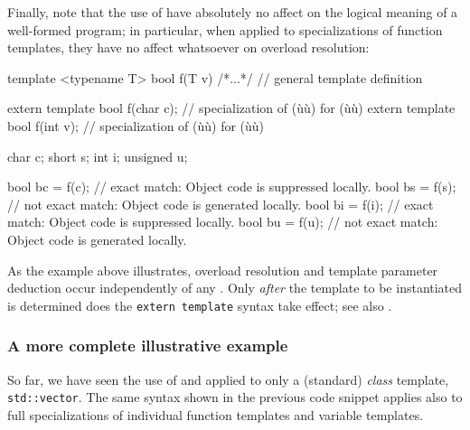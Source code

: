 Finally, note that the use of  have absolutely no affect on the logical meaning of a
well-formed program; in particular, when applied to specializations of
function templates, they have no affect whatsoever on overload
resolution:

\begin{emcppslisting}
template <typename T> bool f(T v) {/*...*/}  // general template definition

extern template bool f(char c);  // specialization of (ù{}ù) for (ù{}ù)
extern template bool f(int v);   // specialization of (ù{}ù) for (ù{}ù)

char     c;
short    s;
int      i;
unsigned u;

bool bc = f(c);  // exact match: Object code is suppressed locally.
bool bs = f(s);  // not exact match: Object code is generated locally.
bool bi = f(i);  // exact match: Object code is suppressed locally.
bool bu = f(u);  // not exact match: Object code is generated locally.
\end{emcppslisting}

\noindent As the example above illustrates, overload resolution and template
parameter deduction occur independently of any
. Only \emph{after}
the template to be instantiated is determined does the
\lstinline!extern!~\lstinline!template! syntax take effect; see also .

\subsubsection[A more complete illustrative example]{A more complete illustrative example}\label{a-more-complete-illustrative-example}

So far, we have seen the use of  and  applied to only a
(standard) \emph{class} template, \lstinline!std::vector!. The same syntax
shown in the previous code snippet applies also to full specializations of individual
function templates and variable templates. %

